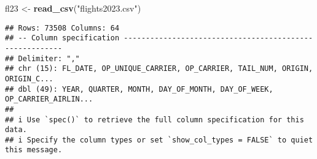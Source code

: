 \documentclass[
]{article}
\newenvironment{Shaded}{\begin{snugshade}}{\end{snugshade}}
\newcommand{\FunctionTok}[1]{\textcolor[rgb]{0.13,0.29,0.53}{\textbf{#1}}}
\newcommand{\NormalTok}[1]{#1}
\newcommand{\OtherTok}[1]{\textcolor[rgb]{0.56,0.35,0.01}{#1}}
\newcommand{\StringTok}[1]{\textcolor[rgb]{0.31,0.60,0.02}{#1}}
\begin{document}
\begin{Shaded}
\begin{Highlighting}[]
\NormalTok{fl23 }\OtherTok{\textless{}{-}} \FunctionTok{read\_csv}\NormalTok{(}\StringTok{"flights2023.csv"}\NormalTok{)}
\end{Highlighting}
\end{Shaded}

\begin{verbatim}
## Rows: 73508 Columns: 64
## -- Column specification --------------------------------------------------------
## Delimiter: ","
## chr (15): FL_DATE, OP_UNIQUE_CARRIER, OP_CARRIER, TAIL_NUM, ORIGIN, ORIGIN_C...
## dbl (49): YEAR, QUARTER, MONTH, DAY_OF_MONTH, DAY_OF_WEEK, OP_CARRIER_AIRLIN...
## 
## i Use `spec()` to retrieve the full column specification for this data.
## i Specify the column types or set `show_col_types = FALSE` to quiet this message.
\end{verbatim}
\end{document}

